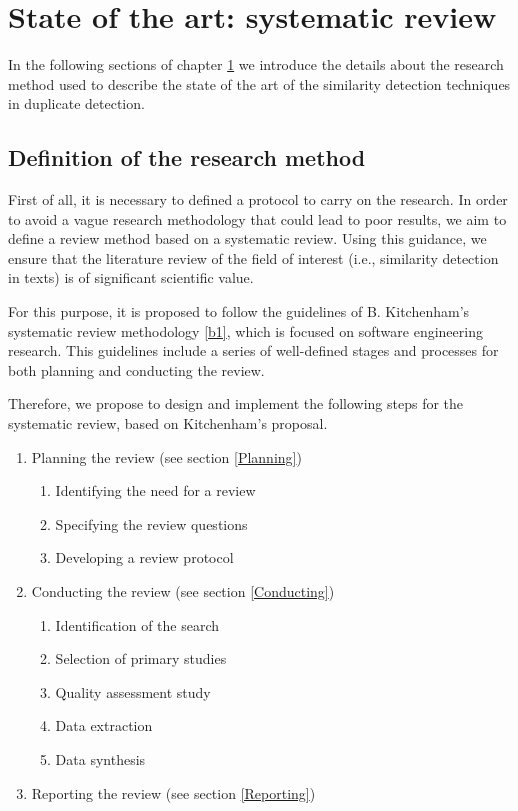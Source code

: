 
\chapter{State of the art: systematic review} %

\label{Chapter2} %


In the following sections of chapter \ref{Chapter2} we introduce the details about the research method used to describe the state of the art of the similarity detection techniques in duplicate detection.

\section{Definition of the research method}

First of all, it is necessary to defined a protocol to carry on the research. In order to avoid a vague research methodology that could lead to poor results, we aim to define a review method based on a systematic review. Using this guidance, we ensure that the literature review of the field of interest (i.e., similarity detection in texts) is of significant scientific value. 

For this purpose, it is proposed to follow the guidelines of B. Kitchenham's systematic review methodology \ref{b1}, which is focused on software engineering research. This guidelines include a series of well-defined stages and processes for both planning and conducting the review. 

Therefore, we propose to design and implement the following steps for the systematic review, based on Kitchenham's proposal.

\begin{enumerate}
\item Planning the review (see section \ref{Planning})
\begin{enumerate}
\item Identifying the need for a review
\item Specifying the review questions
\item Developing a review protocol
\end{enumerate}
\item Conducting the review (see section \ref{Conducting})
\begin{enumerate}
\item Identification of the search
\item Selection of primary studies
\item Quality assessment study
\item Data extraction
\item Data synthesis
\end{enumerate}
\item Reporting the review (see section \ref{Reporting})
\end{enumerate}


